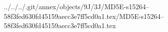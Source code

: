 ../../../.git/annex/objects/9J/3J/MD5E-s15264--58f3fed630fd45159aecc3e7ff5cd0a1.tex/MD5E-s15264--58f3fed630fd45159aecc3e7ff5cd0a1.tex